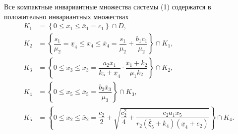 \documentclass[14pt,a4paper]{extarticle}
\begin{document}
	\begin{theorem}\label{th:inv_comp}
		Все компактные инвариантные множества системы (1) содержатся в положительно инвариантных множествах
		\begin{align*}
			K_1 &=\left\{0 \leqslant x_1 \leqslant \overline{x}_1 = c_1\right\}\cap D,\\[6pt]
			K_2 &=\left\{\dfrac{s_1}{\mu_2} = \underline{x}_4 \leqslant x_4 \leqslant \overline{x}_4 = \dfrac{s_1}{\mu_2} + \dfrac{b_1c_1}{\mu_2}\right\}\cap K_1,\\[6pt]
			K_3 &=\left\{0 \leqslant x_3 \leqslant \overline{x}_3 = \dfrac{a_2\overline{x}_1}{k_5+\underline{x}_4}\cdot\dfrac{\overline{x}_1+k_2}{\mu_1k_2}\right\}\cap K_2,\\[6pt]
			K_4 &=\left\{0 \leqslant x_5 \leqslant \overline{x}_5 = \dfrac{b_2\overline{x}_3}{\mu_3}\right\}\cap K_3,\\[6pt]
			K_5 &=\left\{0 \leqslant x_2 \leqslant \overline{x}_2 =  \dfrac{c_2}{2}+\sqrt{\dfrac{c_2^2}{4}+\dfrac{c_2a_1\overline{x}_5}{r_2(\overline{\xi}_5+k_4)(\underline{x}_4+e_2)}}\right\}\cap K_4.
		\end{align*}
	\end{theorem}
\end{document}
